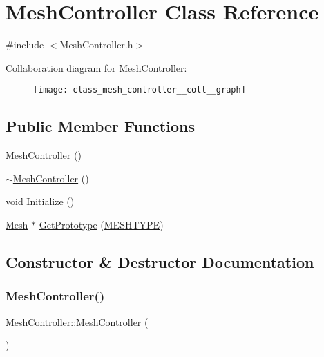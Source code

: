 \hypertarget{class_mesh_controller}{}\section{Mesh\+Controller Class Reference}
\label{class_mesh_controller}


{\ttfamily \#include $<$Mesh\+Controller.\+h$>$}



Collaboration diagram for Mesh\+Controller\+:\nopagebreak
\begin{figure}[H]
\begin{center}
\leavevmode
\texttt{[image: class\_mesh\_controller\_\_coll\_\_graph]}
\end{center}
\end{figure}
\subsection*{Public Member Functions}
\begin{DoxyCompactItemize}
\item 
\mbox{\hyperlink{class_mesh_controller_a3ba0b33a70c6f9671e6d23953928422d}{Mesh\+Controller}} ()
\item 
\mbox{\hyperlink{class_mesh_controller_a674b1738fffaaed8f77970c8ab1c70f8}{$\sim$\+Mesh\+Controller}} ()
\item 
void \mbox{\hyperlink{class_mesh_controller_a7ea29b746017730e12c78dd8ca62e7e6}{Initialize}} ()
\item 
\mbox{\hyperlink{class_mesh}{Mesh}} $\ast$ \mbox{\hyperlink{class_mesh_controller_ad0bee88b35217e415e62a7183ca148a6}{Get\+Prototype}} (\mbox{\hyperlink{_abstract_factory_2_abstract_factory_2builder_2_mesh_builder_8h_ad6436347ddb93aed826a19081b53dd61}{M\+E\+S\+H\+T\+Y\+PE}})
\end{DoxyCompactItemize}


\subsection{Constructor \& Destructor Documentation}
\mbox{\label{class_mesh_controller_a3ba0b33a70c6f9671e6d23953928422d}} 
\subsubsection{\texorpdfstring{MeshController()}{MeshController()}}
{\footnotesize\ttfamily Mesh\+Controller\+::\+Mesh\+Controller (\begin{DoxyParamCaption}{ }\end{DoxyParamCaption})}

